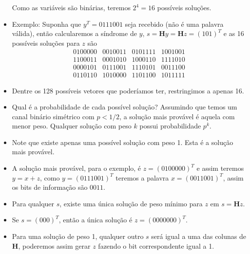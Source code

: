 \begin{frame}[allowframebreaks]
\begin{itemize}
	Como as variáveis são binárias, teremos $2^{4} = 16$ possíveis soluções.
  \item Exemplo: Suponha que $y^T = 0111001$ seja recebido (não é uma palavra válida), então calcularemos a
	síndrome de $y$, $s = \mathbf{H} y = \mathbf{H} z = (101)^T$ e as 16 possíveis soluções para $z$ são
	\begin{equation}
	\begin{matrix}
	0100000 & 0010011 & 0101111 & 1001001 \\
	1100011 & 0001010 & 1000110 & 1111010 \\
	0000101 & 0111001 & 1110101 & 0011100 \\
	0110110 & 1010000 & 1101100 & 1011111
	\end{matrix}
	\end{equation}
  \item Dentre os 128 possíveis vetores que poderíamos ter, restringimos a apenas 16.
  \item Qual é a probabilidade de cada possível solução? Assumindo que temos um canal binário
	simétrico com $p < 1/2$, a solução mais provável é aquela com menor peso. 
	Qualquer solução com peso $k$ possui probabilidade $p^k$.
  \item Note que existe apenas uma possível solução com peso 1. Esta é a solução mais provável.
  \item A solução mais provável, para o exemplo, é $z = (0100000)^T$ e assim teremos
	$y = x + z$, como $y = (0111001)^T$ teremos a palavra $x = (0011001)^T$, assim os
	bits de informação são $0011$.
  \item Para qualquer $s$, existe uma única solução de peso mínimo para $z$ em $s = \mathbf{H} z$.
  \item Se $s = (000)^T$, então a única solução é $z=(0000000)^T$.
  \item Para uma solução de peso 1, qualquer outro $s$ será igual a uma das colunas de $\mathbf{H}$,
	poderemos assim gerar $z$ fazendo o bit correspondente igual a 1.
  \end{itemize}

\end{frame}

